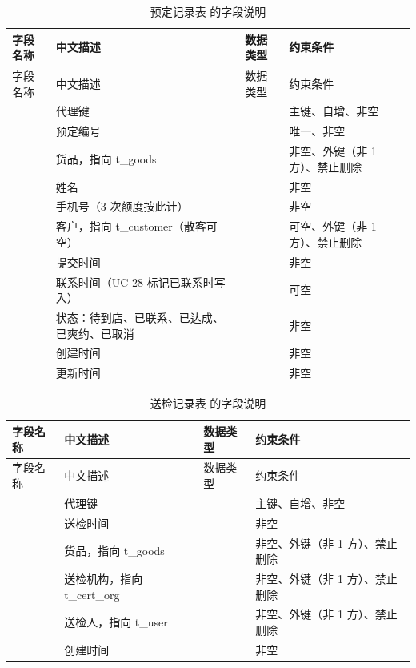 \begin{longtable}{@{}L{3.5cm} L{4.1cm} L{2.9cm} L{4.0cm}@{}}
\caption{预定记录表  的字段说明}\label{tab:f-t-booking}\\
\toprule
字段名称 & 中文描述 & 数据类型 & 约束条件 \\
\midrule
\endfirsthead
\toprule
字段名称 & 中文描述 & 数据类型 & 约束条件 \\
\midrule
\endhead
\bottomrule
\endlastfoot
{} & 代理键 &  & 主键、自增、非空 \\
 & 预定编号 &  & 唯一、非空 \\
 & 货品，指向 t\_goods &  & 非空、外键（非 1 方）、禁止删除 \\
 & 姓名 &  & 非空 \\
 & 手机号（3 次额度按此计） &  & 非空 \\
 & 客户，指向 t\_customer（散客可空） &  & 可空、外键（非 1 方）、禁止删除 \\
 & 提交时间 &  & 非空 \\
 & 联系时间（UC-28 标记已联系时写入） &  & 可空 \\
 & 状态：待到店、已联系、已达成、已爽约、已取消 &  & 非空 \\
 & 创建时间 &  & 非空 \\
 & 更新时间 &  & 非空 \\
\end{longtable}

\begin{longtable}{@{}L{3.5cm} L{4.1cm} L{2.9cm} L{4.0cm}@{}}
\caption{送检记录表  的字段说明}\label{tab:f-t-inspection}\\
\toprule
字段名称 & 中文描述 & 数据类型 & 约束条件 \\
\midrule
\endfirsthead
\toprule
字段名称 & 中文描述 & 数据类型 & 约束条件 \\
\midrule
\endhead
\bottomrule
\endlastfoot
{} & 代理键 &  & 主键、自增、非空 \\
 & 送检时间 &  & 非空 \\
 & 货品，指向 t\_goods &  & 非空、外键（非 1 方）、禁止删除 \\
 & 送检机构，指向 t\_cert\_org &  & 非空、外键（非 1 方）、禁止删除 \\
 & 送检人，指向 t\_user &  & 非空、外键（非 1 方）、禁止删除 \\
 & 创建时间 &  & 非空 \\
\end{longtable}

